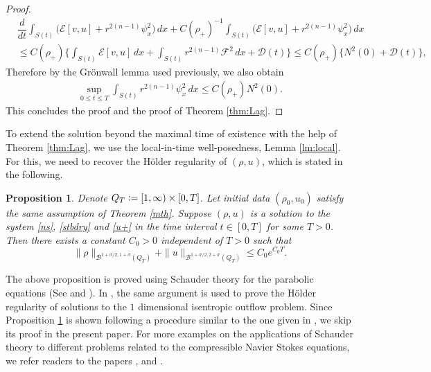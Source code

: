 \documentclass[a4paper,12pt,draft]{article}
\newtheorem{proposition}[theorem]{Proposition}
\theoremstyle{remark}
\def\dif{{\mathrm d}}
\def\mB{\mathcal{B}}
\def\mD{\mathcal{D}}
\def\mE{\mathcal{E}}
\def\mF{\mathcal{F}}
\begin{document}
\begin{proof}
\begin{align*}
        &\dfrac{d}{dt} \int_{S(t)}\!\!\! \big(  \mE[v,u] + r^{2(n-1)} \psi_x^2\big)\, dx + C(\rho_+)^{-1}\int_{S(t)}\!\!\! \big(  \mE[v,u] + r^{2(n-1)} \psi_x^2\big)\, dx\\
        &\le C(\rho_+) \bigg\{ \int_{S(t)}\!\! \mE[v,u]\,d x + \int_{S(t)} r^{2(n-1)} \mF^2\,d x + \mD(t) \bigg\} \le C(\rho_+) \big\{ N^2(0) + \mD(t) \big\},
\end{align*}
Therefore by the Gr\"onwall lemma used previously, we also obtain
\begin{align*}
    \sup\limits_{0\le t\le T}\int_{S(t)}\!\! r^{2(n-1)} \psi_x^2\, dx \le C(\rho_+) N^2(0).
\end{align*}
This concludes the proof and the proof of Theorem \ref{thm:Lag}.
\end{proof}

To extend the solution beyond the maximal time of existence with the help of Theorem \ref{thm:Lag}, we use the local-in-time well-posedness, Lemma \ref{lm:local}. For this, we need to recover the H\"older regularity of $(\rho,u)$, which is stated in the following.
\begin{proposition}\label{prop:schauder}
    Denote $Q_T\vcentcolon=[1,\infty)\times[0,T]$. Let initial data $(\rho_0,u_0)$ satisfy the same assumption of Theorem \ref{mth}. Suppose $(\rho,u)$ is a solution to the system \eqref{ns}, \eqref{stbdry} and \eqref{u+} in the time interval $t\in[0,T]$ for some $T>0$. Then there exists a constant $C_0>0$ independent of $T>0$ such that
    \begin{equation*}
        \| \rho \|_{\mB^{1+\sigma/2,1+\sigma}(Q_T)} + \| u \|_{\mB^{1+\sigma/2,2+\sigma}(Q_T)} \le C_0 e^{C_0 T}.
    \end{equation*}
\end{proposition}
The above proposition is proved using Schauder theory for the parabolic equations (See \cite{friedman64} and \cite{lady}). In \cite{k-n-z03}, the same argument is used to prove the H\"older regularity of solutions to the $1$ dimensional isentropic outflow problem. Since Proposition \ref{prop:schauder} is shown following a procedure similar to the one given in \cite{k-n-z03}, we skip its proof in the present paper. For more examples on the applications of Schauder theory to different problems related to the compressible Navier Stokes equations, we refer readers to the papers \cite{k-n81}, \cite{NNY} and \cite{NN}.
\end{document}
